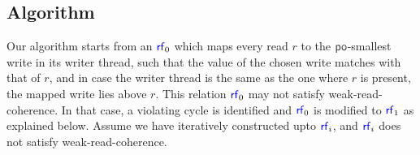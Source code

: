\subsection{Algorithm}
\label{sec:onewriter-algorithm}

Our algorithm starts from an $\rf_0$ which maps every read $r$ to the $\po$-smallest  write in its writer thread, such that the value of the chosen write matches with that of $r$, and in case the writer thread is the same as the one where $r$ is present, the mapped write lies above $r$. This relation $\rf_0$ may not satisfy weak-read-coherence. In that case, a violating cycle is identified and $\rf_0$ is modified to $\rf_1$ as explained below. Assume we have iteratively constructed upto $\rf_i$, and $\rf_i$ does not satisfy weak-read-coherence.  



   
